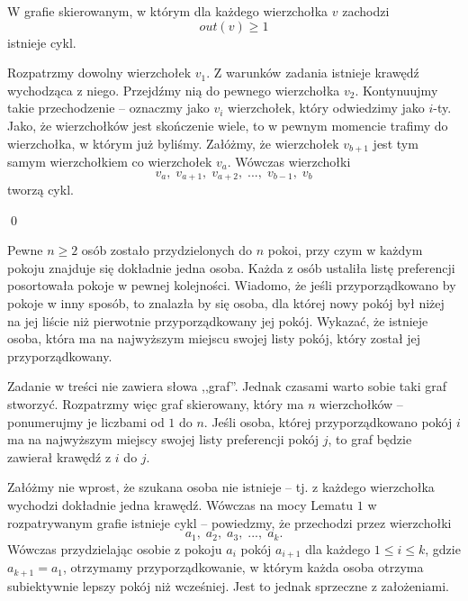 \vspace{10px}


\noindent
W grafie skierowanym, w którym dla każdego wierzchołka $v$ zachodzi 
\[
	out(v) \geqslant 1
\] 
istnieje cykl.

\vspace{5px}


\noindent
Rozpatrzmy dowolny wierzchołek $v_1$. Z warunków zadania istnieje krawędź wychodząca z niego. Przejdźmy nią do pewnego wierzchołka $v_2$. Kontynuujmy takie przechodzenie -- oznaczmy jako $v_i$ wierzchołek, który odwiedzimy jako $i$-ty. Jako, że wierzchołków jest skończenie wiele, to w pewnym momencie trafimy do wierzchołka, w którym już byliśmy. Załóżmy, że wierzchołek $v_{b + 1}$ jest tym samym wierzchołkiem co wierzchołek $v_a$. Wówczas wierzchołki
\[
	v_a, \; v_{a + 1}, \; v_{a + 2}, \; ..., \; v_{b - 1}, \; v_b
\]
tworzą cykl.

\qed

\newpage


\noindent
Pewne $n \geqslant 2$ osób zostało przydzielonych do $n$ pokoi, przy czym w każdym pokoju znajduje się dokładnie jedna osoba. Każda z osób ustaliła listę preferencji posortowała pokoje w pewnej kolejności. Wiadomo, że jeśli przyporządkowano by pokoje w inny sposób, to znalazła by się osoba, dla której nowy pokój był niżej na jej liście niż pierwotnie przyporządkowany jej pokój. Wykazać, że istnieje osoba, która ma na najwyższym miejscu swojej listy pokój, który został jej przyporządkowany.

\vspace{5px}


\noindent
Zadanie w treści nie zawiera słowa ,,graf''. Jednak czasami warto sobie taki graf stworzyć. Rozpatrzmy więc graf skierowany, który ma $n$ wierzchołków -- ponumerujmy je liczbami od $1$ do $n$. Jeśli osoba, której przyporządkowano pokój $i$ ma na najwyższym miejscy swojej listy preferencji pokój $j$, to graf będzie zawierał krawędź z $i$ do $j$. 

\vspace{5px}

\noindent
Załóżmy nie wprost, że szukana osoba nie istnieje -- tj. z każdego wierzchołka wychodzi dokładnie jedna krawędź. Wówczas na mocy Lematu $1$ w rozpatrywanym grafie istnieje cykl -- powiedzmy, że przechodzi przez wierzchołki
\[
	a_1, \; a_2, \; a_3, \; ..., \; a_k.
\]
Wówczas przydzielając osobie z pokoju $a_i$ pokój $a_{i + 1}$ dla każdego $1 \leqslant i \leqslant k$, gdzie $a_{k + 1} = a_1$, otrzymamy przyporządkowanie, w którym każda osoba otrzyma subiektywnie lepszy pokój niż wcześniej. Jest to jednak sprzeczne z założeniami.

